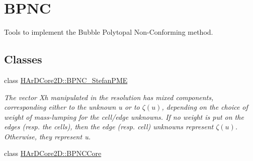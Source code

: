 \hypertarget{group__BPNC}{}\section{B\+P\+NC}
\label{group__BPNC}


Tools to implement the Bubble Polytopal Non-\/\+Conforming method.  


\subsection*{Classes}
\begin{DoxyCompactItemize}
\item 
class \hyperlink{classHArDCore2D_1_1BPNC__StefanPME}{H\+Ar\+D\+Core2\+D\+::\+B\+P\+N\+C\+\_\+\+Stefan\+P\+ME}
\begin{DoxyCompactList}\small\item\em The vector Xh manipulated in the resolution has mixed components, corresponding either to the unknown u or to $\zeta(u)$, depending on the choice of weight of mass-\/lumping for the cell/edge unknowns. If no weight is put on the edges (resp. the cells), then the edge (resp. cell) unknowns represent $\zeta(u)$. Otherwise, they represent u. \end{DoxyCompactList}\item 
class \hyperlink{classHArDCore2D_1_1BPNCCore}{H\+Ar\+D\+Core2\+D\+::\+B\+P\+N\+C\+Core}
\end{DoxyCompactItemize}
